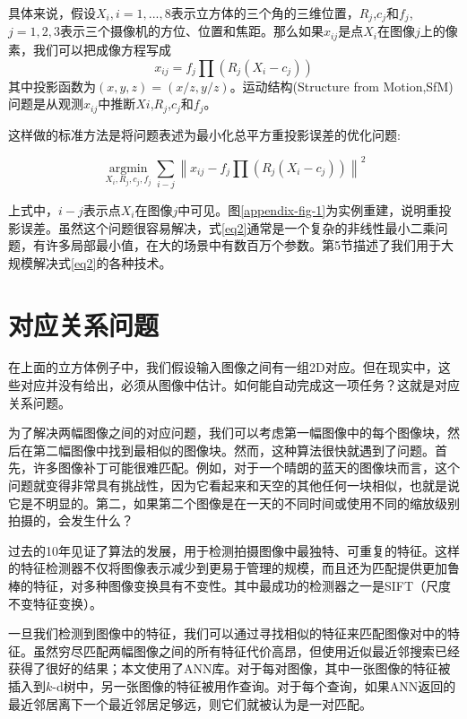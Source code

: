 \begin{translation}
具体来说，假设$X_i,i=1,...,8$表示立方体的三个角的三维位置，$R_j$,$c_j$和$f_j$,$j=1,2,3$表示三个摄像机的方位、位置和焦距。那么如果$x_{ij}$是点$X_i$在图像$j$上的像素，我们可以把成像方程写成
\begin{equation}
	\label{eq1}
	x_{ij}=f_j\prod(R_j(X_i-c_j))
\end{equation}
其中投影函数为$(x,y,z)=(x/z,y/z)$。运动结构(Structure from Motion,SfM)问题是从观测$x_{ij}$中推断$Xi$,$R_j$,$c_j$和$f_j$。

这样做的标准方法是将问题表述为最小化总平方重投影误差的优化问题:

\begin{equation}
	\label{eq2}
	\mathop{\arg\min}\limits_{X_i,R_j,c_j,f_j}\sum_{i-j}\left\| x_{ij}-f_j\prod\left(R_j(X_i-c_j)\right) \right\|^2
\end{equation}

上式中，$i-j$表示点$X_i$在图像$j$中可见。图\ref{appendix-fig-1}为实例重建，说明重投影误差。虽然这个问题很容易解决，式\ref{eq2}通常是一个复杂的非线性最小二乘问题，有许多局部最小值，在大的场景中有数百万个参数。第5节描述了我们用于大规模解决式\ref{eq2}的各种技术。

\section{对应关系问题}
\label{sec-3}
在上面的立方体例子中，我们假设输入图像之间有一组2D对应。但在现实中，这些对应并没有给出，必须从图像中估计。如何能自动完成这一项任务？这就是对应关系问题。

为了解决两幅图像之间的对应问题，我们可以考虑第一幅图像中的每个图像块，然后在第二幅图像中找到最相似的图像块。然而，这种算法很快就遇到了问题。首先，许多图像补丁可能很难匹配。例如，对于一个晴朗的蓝天的图像块而言，这个问题就变得非常具有挑战性，因为它看起来和天空的其他任何一块相似，也就是说它是不明显的。第二，如果第二个图像是在一天的不同时间或使用不同的缩放级别拍摄的，会发生什么？

过去的10年见证了算法的发展，用于检测拍摄图像中最独特、可重复的特征。这样的特征检测器不仅将图像表示减少到更易于管理的规模，而且还为匹配提供更加鲁棒的特征，对多种图像变换具有不变性。其中最成功的检测器之一是SIFT（尺度不变特征变换）\cite{lowe2004distinctive}。

一旦我们检测到图像中的特征，我们可以通过寻找相似的特征来匹配图像对中的特征。虽然穷尽匹配两幅图像之间的所有特征代价高昂，但使用近似最近邻搜索已经获得了很好的结果\cite{snavely2006photo}；本文使用了ANN库\cite{arya1998optimal}。对于每对图像，其中一张图像的特征被插入到$k$-d树中，另一张图像的特征被用作查询。对于每个查询，如果ANN返回的最近邻居离下一个最近邻居足够远，则它们就被认为是一对匹配\cite{lowe2004distinctive}。


\end{translation}

